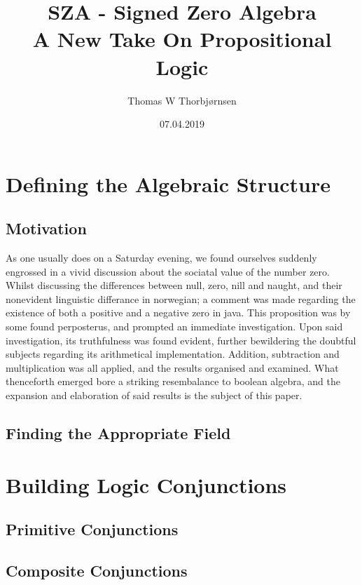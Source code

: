 \documentclass{article}
\title{SZA - Signed Zero Algebra \\
       \large A New Take On Propositional Logic}
\author{Thomas W Thorbjørnsen}
\date{07.04.2019}
\begin{document}
  \maketitle
  \tableofcontents

  \newpage

  \section{Defining the Algebraic Structure}
    \subsection*{Motivation}
      As one usually does on a Saturday evening, we found ourselves suddenly engrossed in a vivid discussion
      about the sociatal value of the number zero. Whilst discussing the differences between null, zero, nill and naught, and their nonevident
      linguistic differance in norwegian; a comment was made regarding the existence of both a positive and a negative zero in java.
      This proposition was by some found perposterus, and prompted an immediate investigation.
      Upon said investigation, its truthfulness was found evident, further bewildering the doubtful subjects regarding its arithmetical implementation.
      Addition, subtraction and multiplication was all applied, and the results organised and examined.
      What thenceforth emerged bore a striking resembalance to boolean algebra,
      and the expansion and elaboration of said results is the subject of this paper.

    \subsection*{Finding the Appropriate Field}

  \newpage

  \section{Building Logic Conjunctions}
    \subsection*{Primitive Conjunctions}

    \subsection*{Composite Conjunctions}
\end{document}
